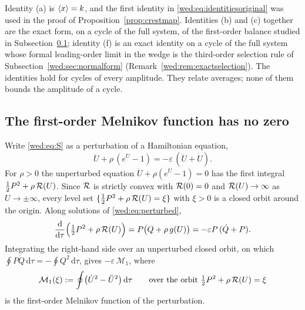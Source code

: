 Identity (a) is $\left\langle x\right\rangle=k$, and the first identity in \eqref{wed:eq:identitiesoriginal} was used in the proof of Proposition~\ref{prop:crestmap}. Identities (b) and (c) together are the exact form, on a cycle of the full system, of the first-order balance studied in Subsection~\ref{wed:sec:melnikov}; identity (f) is an exact identity on a cycle of the full system whose formal leading-order limit in the wedge is the third-order selection rule of Subsection~\ref{wed:sec:normalform} (Remark~\ref{wed:rem:exactselection}). The identities hold for cycles of every amplitude. They relate averages; none of them bounds the amplitude of a cycle.

\subsection{The first-order Melnikov function has no zero}\label{wed:sec:melnikov}
Write \eqref{wed:eq:S} as a perturbation of a Hamiltonian equation,
\begin{equation}\label{wed:eq:perturbed}
\ddot U+\rho\,(e^U-1)=-\varepsilon\,(\dddot U+\dot U).
\end{equation}
For $\rho>0$ the unperturbed equation $\ddot U+\rho(e^U-1)=0$ has the first integral $\tfrac12P^2+\rho\,\mathcal R(U)$. Since $\mathcal R$ is strictly convex with $\mathcal R(0)=0$ and $\mathcal R(U)\to\infty$ as $U\to\pm\infty$, every level set $\{\tfrac12P^2+\rho\,\mathcal R(U)=\xi\}$ with $\xi>0$ is a closed orbit around the origin. Along solutions of \eqref{wed:eq:perturbed},
\begin{equation}\label{wed:eq:energybalance}
\frac{\mathrm d}{\mathrm d\tau}\Bigl(\tfrac12P^2+\rho\,\mathcal R(U)\Bigr)=P\bigl(Q+\rho\,g(U)\bigr)=-\varepsilon P\,(\dot Q+P).
\end{equation}
Integrating the right-hand side over an unperturbed closed orbit, on which $\oint P\dot Q\,\mathrm d\tau=-\oint Q^2\,\mathrm d\tau$, gives $-\varepsilon\,\mathcal M_1$, where
\begin{equation}\label{wed:eq:melnikov}
\mathcal M_1(\xi):=\oint\bigl(\dot U^2-\ddot U^2\bigr)\,\mathrm d\tau
\qquad\text{over the orbit }\tfrac12P^2+\rho\,\mathcal R(U)=\xi
\end{equation}
is the first-order Melnikov function of the perturbation.

